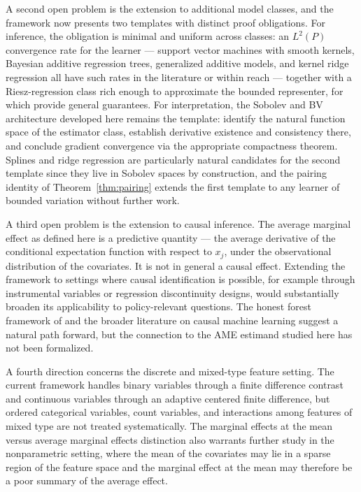 \documentclass[12pt]{article}
\begin{document}
	A second open problem is the extension to additional model classes, and the
	framework now presents two templates with distinct proof obligations. For
	inference, the obligation is minimal and uniform across classes: an $L^2(P)$
	convergence rate for the learner --- support vector machines with smooth kernels,
	Bayesian additive regression trees, generalized additive models, and kernel ridge
	regression all have such rates in the literature or within reach --- together
	with a Riesz-regression class rich enough to approximate the bounded representer,
	for which \citet{chernozhukov2022riesz} provide general guarantees. For
	interpretation, the Sobolev and BV architecture developed here remains the
	template: identify the natural function space of the estimator class, establish
	derivative existence and consistency there, and conclude gradient convergence
	via the appropriate compactness theorem. Splines and ridge regression are
	particularly natural candidates for the second template since they live in
	Sobolev spaces by construction, and the pairing identity of
	Theorem~\ref{thm:pairing} extends the first template to any learner of bounded
	variation without further work.
	
	A third open problem is the extension to causal inference. The average marginal effect
	as defined here is a predictive quantity --- the average derivative of the conditional
	expectation function with respect to $x_j$, under the observational distribution of
	the covariates. It is not in general a causal effect. Extending the framework to
	settings where causal identification is possible, for example through instrumental
	variables or regression discontinuity designs, would substantially broaden its
	applicability to policy-relevant questions. The honest forest framework of
	\citet{wager2018forests} and the broader literature on causal machine learning suggest
	a natural path forward, but the connection to the AME estimand studied here has not
	been formalized.
	
	A fourth direction concerns the discrete and mixed-type feature setting. The current
	framework handles binary variables through a finite difference contrast and continuous
	variables through an adaptive centered finite difference, but ordered categorical
	variables, count variables, and interactions among features of mixed type are not
	treated systematically. The marginal effects at the mean versus average marginal
	effects distinction \citep{greene2012, wooldridge2010} also warrants further study in
	the nonparametric setting, where the mean of the covariates may lie in a sparse region
	of the feature space and the marginal effect at the mean may therefore be a poor
	summary of the average effect.
	
\end{document}
